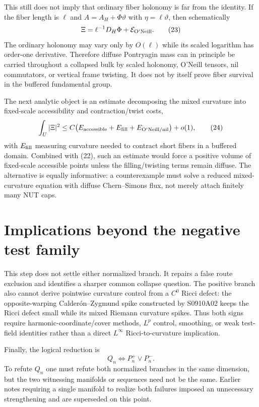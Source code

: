 This still does not imply that ordinary fiber holonomy is far from the
identity.  If the fiber length is $\ell$ and
$A=A_H+\Phi\vartheta$ with $\eta=\ell\vartheta$, then schematically
\[
 \Xi=\ell^{-1}D_H\Phi+\mathcal E_{\rm O'Neill}.                 \tag{23}
\]
The ordinary holonomy may vary only by $O(\ell)$ while its scaled logarithm
has order-one derivative.  Therefore diffuse Pontryagin mass can in principle
be carried throughout a collapsed bulk by scaled holonomy, O'Neill tensors,
nil commutators, or vertical frame twisting.  It does not by itself prove
fiber survival in the buffered fundamental group.

The next analytic object is an estimate decomposing the mixed curvature into
fixed-scale accessibility and contraction/twist costs,
\[
 \int_U|\Xi|^2
 \le C\big(E_{\rm accessible}+E_{\rm fill}
                 +E_{\rm O'Neill/nil}\big)+o(1),               \tag{24}
\]
with $E_{\rm fill}$ measuring curvature needed to contract short fibers in a
buffered domain.  Combined with (22), such an estimate would force a positive
volume of fixed-scale accessible points unless the filling/twisting terms
remain diffuse.  The alternative is equally informative: a counterexample
must solve a reduced mixed-curvature equation with diffuse Chern--Simons flux,
not merely attach finitely many NUT caps.

\section{Implications beyond the negative test family}

This step does not settle either normalized branch.  It repairs a false
route exclusion and identifies a sharper common collapse question.  The
positive branch also cannot derive pointwise curvature control from a
$C^0$ Ricci defect: the opposite-warping Calder\'on--Zygmund spike constructed
by S0910A02 keeps the Ricci defect small while its mixed Riemann curvature
spikes.  Thus both signs require harmonic-coordinate/cover methods,
$L^p$ control, smoothing, or weak test-field identities rather than a direct
$L^\infty$ Ricci-to-curvature implication.

Finally, the logical reduction is
\[
 Q_n\Longleftrightarrow P_n^+\lor P_n^-.
\]
To refute $Q_n$ one must refute both normalized branches in the same
dimension, but the two witnessing manifolds or sequences need not be the
same.  Earlier notes requiring a single manifold to realize both failures
imposed an unnecessary strengthening and are superseded on this point.
